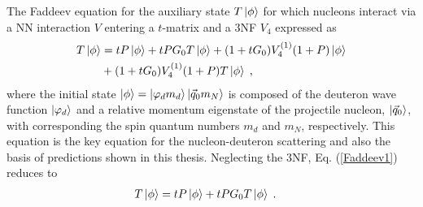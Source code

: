 The Faddeev equation for the auxiliary state $T\ket{\phi}$ for which nucleons interact via a NN interaction $V$ entering a $t$-matrix and a 3NF $V_{4}$ expressed as
\begin{equation}
\begin{split}
T\ket{\phi} &= t P \ket{\phi} + tP G_{0}T\ket{\phi} + (1 + tG_{0})V^{(1)}_{4}(1 + P)\ket{\phi} \\
&+(1 + tG_{0})V^{(1)}_{4}(1 + P)T\ket{\phi}\;,
\label{Faddeev1}
\end{split}
\end{equation}
where the initial state $\ket{\phi} = \ket{\varphi_{d}m_{d}}\ket{\vec{q}_{0}m_{N}}$ is composed of the deuteron wave function $\ket{\varphi_{d}}$ and a relative momentum eigenstate of the projectile nucleon, $\ket{\vec{q}_{0}}$, with corresponding the spin quantum numbers $m_{d}$ and $m_{N}$, respectively. 
This equation is the key equation for the nucleon-deuteron scattering and also the basis of predictions shown in this thesis. Neglecting the 3NF, Eq. (\ref{Faddeev1}) reduces to
\begin{equation}
\begin{split}
T\ket{\phi} &= t P \ket{\phi} + tP G_{0}T\ket{\phi}\;.
\label{Faddeev2}
\end{split}
\end{equation}

